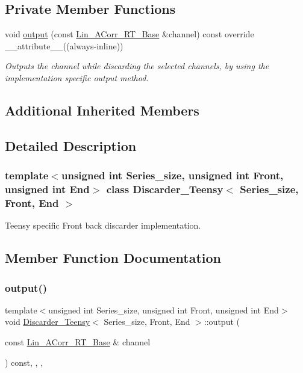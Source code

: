 \subsection*{Private Member Functions}
\begin{DoxyCompactItemize}
\item 
void \hyperlink{classDiscarder__Teensy_a4edb6d02ac299d4c578a4c8522f0dffd}{output} (const \hyperlink{classLin__ACorr__RT__Base}{Lin\+\_\+\+A\+Corr\+\_\+\+R\+T\+\_\+\+Base} \&channel) const override \+\_\+\+\_\+attribute\+\_\+\+\_\+((always-\/inline))
\begin{DoxyCompactList}\small\item\em Outputs the channel while discarding the selected channels, by using the implementation specific output method. \end{DoxyCompactList}\end{DoxyCompactItemize}
\subsection*{Additional Inherited Members}


\subsection{Detailed Description}
\subsubsection*{template$<$unsigned int Series\+\_\+size, unsigned int Front, unsigned int End$>$\newline
class Discarder\+\_\+\+Teensy$<$ Series\+\_\+size, Front, End $>$}

Teensy specific Front back discarder implementation. 

\subsection{Member Function Documentation}
\mbox{\label{classDiscarder__Teensy_a4edb6d02ac299d4c578a4c8522f0dffd}} 
\subsubsection{\texorpdfstring{output()}{output()}}
{\footnotesize\ttfamily template$<$unsigned int Series\+\_\+size, unsigned int Front, unsigned int End$>$ \\
void \hyperlink{classDiscarder__Teensy}{Discarder\+\_\+\+Teensy}$<$ Series\+\_\+size, Front, End $>$\+::output (\begin{DoxyParamCaption}\item[{const \hyperlink{classLin__ACorr__RT__Base}{Lin\+\_\+\+A\+Corr\+\_\+\+R\+T\+\_\+\+Base} \&}]{channel }\end{DoxyParamCaption}) const\hspace{0.3cm}{\ttfamily [inline]}, {\ttfamily [override]}, {\ttfamily [private]}, {\ttfamily [virtual]}}



